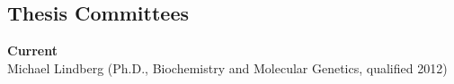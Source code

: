 \documentclass[margin,line]{cv}
\begin{document}
\begin{resume}
    
    
    \section{\mysidestyle Thesis Committees}
    \textbf{Current} \\
    Michael Lindberg (Ph.D., Biochemistry and Molecular Genetics, qualified 2012)
    
    

\end{resume}
\end{document}
